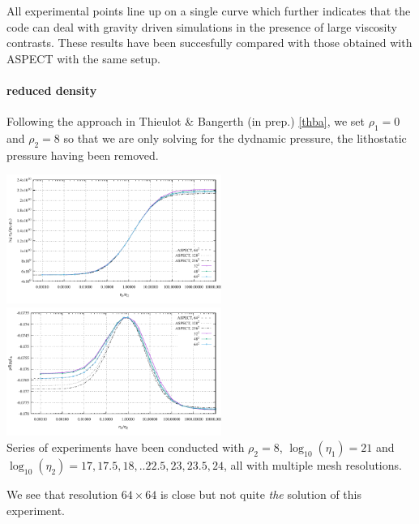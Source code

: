All experimental points line up on a single curve which further
indicates that the code can deal with gravity driven simulations in the presence
of large viscosity contrasts. These results have been succesfully compared with 
those obtained with ASPECT with the same setup.

\paragraph{reduced density}

Following the approach in Thieulot \& Bangerth (in prep.) \ref{thba}, 
we set $\rho_1=0$ and $\rho_2=8$ so that we are only solving for the dydnamic 
pressure, the lithostatic pressure having been removed.

\begin{center}
\includegraphics[width=7cm]{python_codes/fieldstone_53/results/reduced/results_v.pdf}
\includegraphics[width=7cm]{python_codes/fieldstone_53/results/reduced/results_p.pdf}\\
{\captionfont
Series of experiments have been conducted with $\rho_2=8$, 
$\log_{10}(\eta_1)=21$ and $\log_{10}(\eta_2)=17,17.5,18,..22.5,23,23.5,24$, 
all with multiple mesh resolutions.}
 \end{center}

We see that resolution $64\times 64$ is close but not quite {\sl the} solution of this experiment. 
